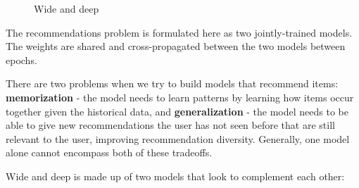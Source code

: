 \documentclass[11pt, table]{diazessay} %
\begin{document}
\begin{sloppypar}
\begin{figure}[H]
\caption{Wide and deep \citep{cheng2016wide}}
\end{figure}

The recommendations problem is formulated here as two jointly-trained models. The weights are shared and cross-propagated between the two models between epochs.

There are two problems when we try to build models that recommend items: \textbf{memorization} - the model needs to learn patterns by learning how items occur together given the historical data, and \textbf{generalization} - the model needs to be able to give new recommendations the user has not seen before that are still relevant to the user, improving recommendation diversity. Generally, one model alone cannot encompass both of these tradeoffs.  

Wide and deep is made up of two models that look to complement each other:


\end{sloppypar}
\end{document}
